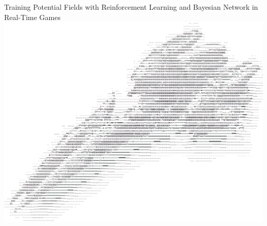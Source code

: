 \thispagestyle{empty}
\begin{center}
  \Huge
	Training Potential Fields with Reinforcement Learning and Bayesian Network in Real-Time Games
	\vspace*{1.5in}~\\
	\hspace*{-1in}
    \includegraphics[scale=0.60]{Figures/FrontPage/FrontPage.png}
			
\end{center}



